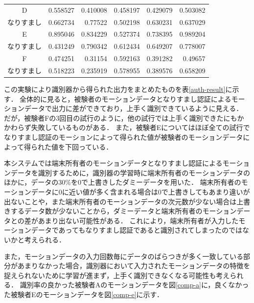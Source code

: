 \begin{table}[btph]
\begin{tabular}{|c|r|r|r|r|r|}
    D & 0.558527 & 0.410008 & 0.458197 & 0.429079 & 0.503082 \\
    なりすまし & 0.662734 & 0.77522 & 0.502198 & 0.630231 & 0.637029 \\ \hline
    E & 0.895046 & 0.834229 & 0.527374 & 0.738395 & 0.989204 \\
    なりすまし & 0.431249 & 0.790342 & 0.612434 & 0.649207 & 0.778007 \\ \hline
    F & 0.474251 & 0.31154 & 0.592163 & 0.391282 & 0.49657 \\
    なりすまし & 0.518223 & 0.235919 & 0.578955 & 0.389576 & 0.658209 \\ \hline
  \end{tabular}
\end{table}

この実験により識別器から得られた出力をまとめたものを表\ref{auth-result}に示す．
全体的に見ると，被験者のモーションデータとなりすまし認証によるモーションデータで出力に差ができており，上手く識別できているように見える．
だが，被験者Fの3回目の試行のように，他の試行では上手く識別できたにもかかわらず失敗しているものがある．
また，被験者Eについてはほぼ全ての試行でなりすまし認証のモーションによって得られた値が被験者のモーションデータによって得られた値を下回っている．

本システムでは端末所有者のモーションデータとなりすまし認証によるモーションデータを識別するために，識別器の学習時に端末所有者のモーションデータのほかに，データの30\%を0で上書きしたダミーデータを用いた．
端末所有者のモーションデータに0に近い値が多く含まれる場合は0で上書きしてもあまり違いが出ないことや，また端末所有者のモーションデータの次元数が少ない場合は上書きするデータ数が少ないことから，ダミーデータと端末所有者のモーションデータとの差があまり出ない可能性がある．
これにより，端末所有者が入力したモーションデータであってもなりすまし認証であると識別されてしまったのではないかと考えられる．

また，モーションデータの入力回数毎にデータのばらつきが多く一致している部分があまりなかった場合，識別器において入力されたモーションデータの特徴を捉えられないために学習が進まず，上手く識別できなくなる可能性も考えられる．
識別率の良かった被験者Aのモーションデータを図\ref{comp-a}に，良くなかった被験者Eのモーションデータを図\ref{comp-e}に示す．

